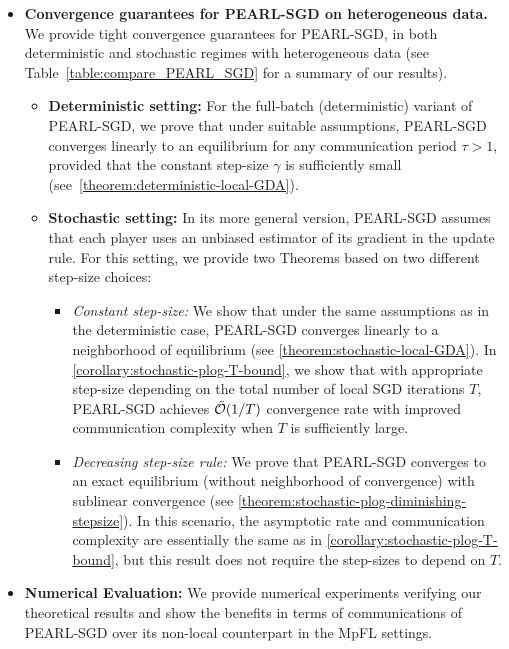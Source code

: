 \documentclass{article}
\newcommand{\algname}[1]{{\color{PineGreen}\sf  #1}\xspace}
\newcommand{\cO}{{\mathcal{O}}}
\newcommand{\abbvname}{\algname{PEARL-SGD}}
\theoremstyle{plain}
\theoremstyle{remark}
\begin{document}
\begin{itemize}[leftmargin=*]
    \item \textbf{Convergence guarantees for \abbvname on heterogeneous data.} We provide tight convergence guarantees for \abbvname, in both deterministic and stochastic regimes with heterogeneous data (see Table~\ref{table:compare_PEARL_SGD} for a summary of our results). 
    \begin{itemize}[leftmargin=*]
    \setlength{\itemsep}{2pt}
        \item \textbf{Deterministic setting:}  For the full-batch (deterministic) variant of \abbvname, we prove that under suitable assumptions, \abbvname converges linearly to an equilibrium for any communication period $\tau > 1$, provided that the constant step-size $\gamma$ is sufficiently small (see~\cref{theorem:deterministic-local-GDA}).
        \item \textbf{Stochastic setting:} In its more general version, \abbvname assumes that each player uses an unbiased estimator of its gradient in the update rule. For this setting, we provide two Theorems based on two different step-size choices:
        \begin{itemize}[leftmargin=*]
            \item \textit{Constant step-size:} We show that under the same assumptions as in the deterministic case, \abbvname converges linearly to a neighborhood of equilibrium (see \cref{theorem:stochastic-local-GDA}). 
            In \cref{corollary:stochastic-plog-T-bound}, we show that with appropriate step-size depending on the total number of local SGD iterations $T$, \abbvname achieves $\Tilde{\cO}(1/T)$ convergence rate with improved communication complexity when $T$ is sufficiently large.
            \item \textit{Decreasing step-size rule:} We prove that \abbvname converges to an exact equilibrium (without neighborhood of convergence) with sublinear convergence (see \cref{theorem:stochastic-plog-diminishing-stepsize}). In this scenario, the asymptotic rate and communication complexity are essentially the same as in \cref{corollary:stochastic-plog-T-bound}, but this result does not require the step-sizes to depend on $T$.
        \end{itemize}
    \end{itemize}

    \item \textbf{Numerical Evaluation:} We provide numerical experiments verifying our theoretical results and show the benefits in terms of communications of \abbvname over its non-local counterpart in the MpFL settings. 
\end{itemize}
\end{document}
